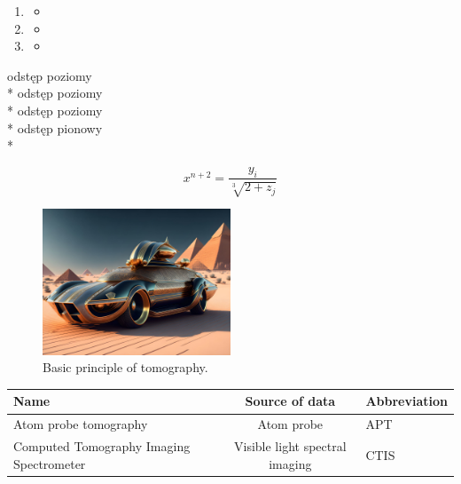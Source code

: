 \documentclass[a4paper,twoside,onecolumn]{report}
\begin{document}
\begin{enumerate}
			\item 
			\begin{itemize}
				\item 
			\end{itemize}

			\item 
			\begin{itemize}
				\item 
			\end{itemize}

			\item 
			\begin{itemize}
				\item 
			\end{itemize}

		\end{enumerate}

odstęp \hspace{1cm} poziomy \\*
odstęp  poziomy \\*
odstęp \hfill poziomy \\*
odstęp \vspace{1cm} pionowy \\*



	\begin{equation}
		x^{n + 2} = \frac{y_{i}}{\sqrt[3]{2 + z_{j}}}
	\end{equation}


	\begin{figure}[h]
		\centering
		\includegraphics[width=0.5\textwidth]{picture1.jpg}
		\caption{Basic principle of tomography.}
	\end{figure}

\begin{tabularx}{\textwidth}{ || X | c | l || }
	\hline
	Name                                     & Source of data                 & Abbreviation \\
	\hline \hline
	Atom probe tomography                    & Atom probe                     & APT          \\
	\hline
	Computed Tomography Imaging Spectrometer & Visible light spectral imaging & CTIS         \\
	\hline
\end{tabularx}
\end{document}
